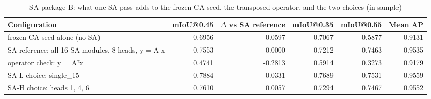 \begin{table}[H]\centering\scriptsize\setlength{\tabcolsep}{3pt}
\begin{tabular}{>{\raggedright\arraybackslash}p{5.47cm}rrrrr}
\toprule
Configuration & mIoU@0.45 & $\Delta$ vs SA reference & mIoU@0.35 & mIoU@0.55 & Mean AP \\
\midrule
frozen CA seed alone (no SA) & 0.6956 & -0.0597 & 0.7067 & 0.5877 & 0.9131 \\
SA reference: all 16 SA modules, 8 heads, y = A x & 0.7553 & 0.0000 & 0.7212 & 0.7463 & 0.9535 \\
operator check: y = Aᵀx & 0.4741 & -0.2813 & 0.5914 & 0.3273 & 0.9179 \\
SA-L choice: single\_\allowbreak{}15 & 0.7884 & 0.0331 & 0.7689 & 0.7531 & 0.9559 \\
SA-H choice: heads 1, 4, 6 & 0.7610 & 0.0057 & 0.7294 & 0.7467 & 0.9552 \\
\bottomrule
\end{tabular}
\caption{SA package B: what one SA pass adds to the frozen CA seed, the transposed operator, and the two choices (in-sample)}\label{tab:a4_checks}
\end{table}
